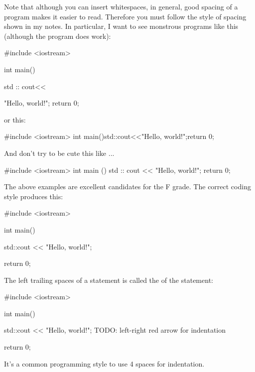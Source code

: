 Note that although you can insert whitespaces, 
in general, good spacing of a program makes it easier to read. 
Therefore you must follow the style of spacing shown in my notes. 
In particular, I 
 want to see monstrous programs like this 
(although the program does work):
\begin{console}
#include <iostream>

int                        main(){std
::
                    cout<<

"Hello, world!\n"; return 0; }
\end{console}
or this: 
\begin{console}
#include <iostream>
int main(){std::cout<<"Hello, world!\n";return 0;}
\end{console}
And don't try to be cute this like ...
\begin{console}
#include <iostream>
int
 main
  ()
   {
    std
     ::
      cout
       <<
        "Hello, world!\n"; 
         return 0; 
          }
\end{console}
The above examples are excellent candidates for the F grade. 
The correct coding style produces this:
\begin{console}
#include <iostream>

int main()
{
    std::cout << "Hello, world!\n";

    return 0;
}
\end{console}

The left trailing spaces of a statement is called the 
of the statement:
\begin{console}
#include <iostream>

int main()
{
    std::cout << "Hello, world!\n";
    TODO: left-right red arrow for indentation
 
    return 0;
}
\end{console}
It's a common programming style to use 4 spaces for indentation. 








